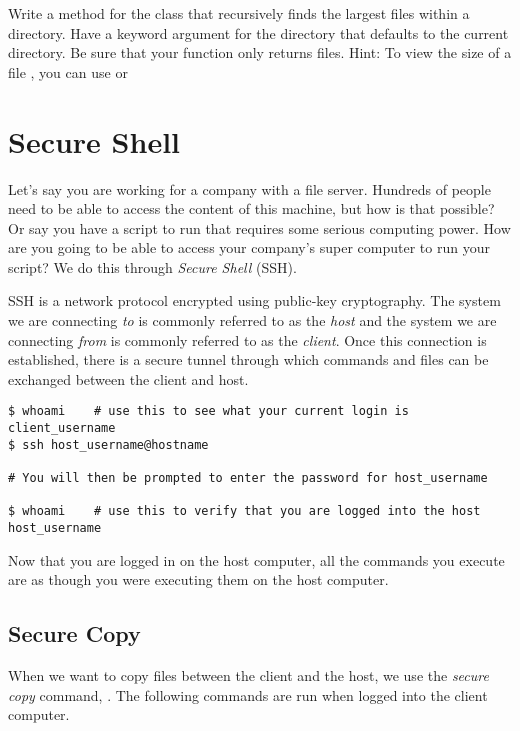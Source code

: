 \begin{problem}
Write a method for the  class that recursively finds the  largest files within a directory. Have a keyword argument for the directory that defaults to the current directory. Be sure that your function only returns files. Hint: To view the size of a file , you can use  or 
\end{problem}

\section*{Secure Shell}

Let's say you are working for a company with a file server. Hundreds of people need to be able to access the content of this machine, but how is that possible? Or say you have a script to run that requires some serious computing power. How are you going to be able to access your company's super computer to run your script? We do this through \emph{Secure Shell} (SSH).

SSH is a network protocol encrypted using public-key cryptography. The system we are connecting \emph{to} is commonly referred to as the \emph{host} and the system we are connecting \emph{from} is commonly referred to as the \emph{client}. Once this connection is established, there is a secure tunnel through which commands and files can be exchanged between the client and host.

\begin{lstlisting}
$ whoami    # use this to see what your current login is
client_username
$ ssh host_username@hostname

# You will then be prompted to enter the password for host_username

$ whoami    # use this to verify that you are logged into the host
host_username
\end{lstlisting}

Now that you are logged in on the host computer, all the commands you execute are as though you were executing them on the host computer.

\subsection*{Secure Copy}

When we want to copy files between the client and the host, we use the  \emph{secure copy} command, . The following commands are run when logged into the client computer.

